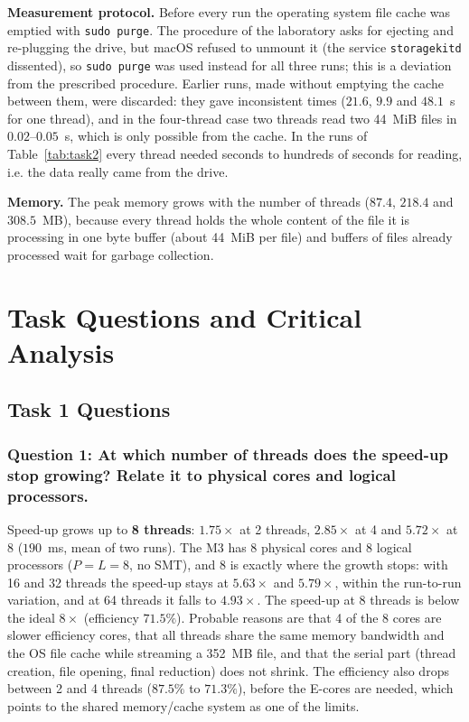 \documentclass[11pt,a4paper]{article}
\begin{document}
\textbf{Measurement protocol.} Before every run the operating system file cache was emptied with \texttt{sudo purge}. The procedure of the laboratory asks for ejecting and re-plugging the drive, but macOS refused to unmount it (the service \texttt{storagekitd} dissented), so \texttt{sudo purge} was used instead for all three runs; this is a deviation from the prescribed procedure. Earlier runs, made without emptying the cache between them, were discarded: they gave inconsistent times ($21.6$, $9.9$ and $48.1$~s for one thread), and in the four-thread case two threads read two 44~MiB files in $0.02$--$0.05$~s, which is only possible from the cache. In the runs of Table~\ref{tab:task2} every thread needed seconds to hundreds of seconds for reading, i.e. the data really came from the drive.

\textbf{Memory.} The peak memory grows with the number of threads ($87.4$, $218.4$ and $308.5$~MB), because every thread holds the whole content of the file it is processing in one byte buffer (about 44~MiB per file) and buffers of files already processed wait for garbage collection.

\section{Task Questions and Critical Analysis}

\subsection{Task 1 Questions}

\subsubsection{Question 1: At which number of threads does the speed-up stop growing? Relate it to physical cores and logical processors.}
Speed-up grows up to \textbf{8 threads}: $1.75\times$ at 2 threads, $2.85\times$ at 4 and $5.72\times$ at 8 ($190$~ms, mean of two runs). The M3 has 8 physical cores and 8 logical processors ($P = L = 8$, no SMT), and 8 is exactly where the growth stops: with 16 and 32 threads the speed-up stays at $5.63\times$ and $5.79\times$, within the run-to-run variation, and at 64 threads it falls to $4.93\times$. The speed-up at 8 threads is below the ideal $8\times$ (efficiency $71.5\%$). Probable reasons are that 4 of the 8 cores are slower efficiency cores, that all threads share the same memory bandwidth and the OS file cache while streaming a 352~MB file, and that the serial part (thread creation, file opening, final reduction) does not shrink. The efficiency also drops between 2 and 4 threads ($87.5\%$ to $71.3\%$), before the E-cores are needed, which points to the shared memory/cache system as one of the limits.
\end{document}
